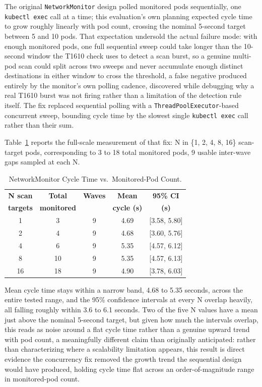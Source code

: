 \documentclass{ieeeaccess}
\begin{document}
The original \texttt{NetworkMonitor} design polled monitored pods
sequentially, one \texttt{kubectl exec} call at a time; this
evaluation's own planning expected cycle time to grow roughly linearly
with pod count, crossing the nominal 5-second target between 5 and 10
pods. That expectation undersold the actual failure mode: with enough
monitored pods, one full sequential sweep could take longer than the
10-second window the T1610 check uses to detect a scan burst, so a
genuine multi-pod scan could split across two sweeps and never
accumulate enough distinct destinations in either window to cross the
threshold, a false negative produced entirely by the monitor's own
polling cadence, discovered while debugging why a real T1610 burst was
not firing rather than a limitation of the detection rule itself. The
fix replaced sequential polling with a \texttt{ThreadPoolExecutor}-based
concurrent sweep, bounding cycle time by the slowest single \texttt{kubectl
exec} call rather than their sum.

Table~\ref{tab:scalability} reports the full-scale measurement of that fix: N in
\{1, 2, 4, 8, 16\} scan-target pods, corresponding to 3 to 18 total
monitored pods, 9 usable inter-wave gaps sampled at each N.

\begin{table}[!t]
\centering
\caption{NetworkMonitor Cycle Time vs.\ Monitored-Pod Count.}
\label{tab:scalability}
\tablebodyfont
\begin{tabular}{@{}ccccc@{}}
\toprule
\textbf{N scan} & \textbf{Total} & \textbf{Waves} & \textbf{Mean} & \textbf{95\% CI} \\
\textbf{targets} & \textbf{monitored} & & \textbf{cycle (s)} & \textbf{(s)} \\
\midrule
1 & 3 & 9 & 4.69 & [3.58, 5.80] \\
2 & 4 & 9 & 4.68 & [3.60, 5.76] \\
4 & 6 & 9 & 5.35 & [4.57, 6.12] \\
8 & 10 & 9 & 5.35 & [4.57, 6.13] \\
16 & 18 & 9 & 4.90 & [3.78, 6.03] \\
\bottomrule
\end{tabular}
\end{table}

Mean cycle time stays within a narrow band, 4.68 to 5.35 seconds,
across the entire tested range, and the 95\% confidence intervals at
every N overlap heavily, all falling roughly within 3.6 to 6.1 seconds.
Two of the five N values have a mean just above the nominal 5-second
target, but given how much the intervals overlap, this reads as noise
around a flat cycle time rather than a genuine upward trend with pod
count, a meaningfully different claim than originally anticipated:
rather than characterizing where a scalability limitation appears,
this result is direct evidence the concurrency fix removed the growth
trend the sequential design would have produced, holding cycle time
flat across an order-of-magnitude range in monitored-pod count.
\end{document}
